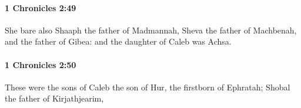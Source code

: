 		\paragraph{1 Chronicles 2:49} %
			\label{1CHRONICLES-2-49}

			She bare also Shaaph the father of Madmannah, Sheva the father of Machbenah, and the father of Gibea: and the daughter of Caleb was Achsa.


		\paragraph{1 Chronicles 2:50} %
			\label{1CHRONICLES-2-50}

			These were the sons of Caleb the son of Hur, the firstborn of Ephratah; Shobal the father of Kirjathjearim,


